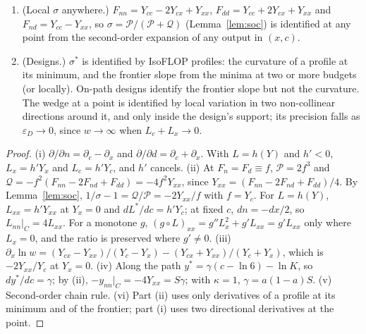 \begin{proposition}
\begin{enumerate}
imposes $S=\gamma/[a(1-a)]$: the curvature of every IsoFLOP profile in log reducible loss is pinned by the slopes of the
frontier and of the path. With $\kappa$ free the curvature is a separate parameter, which \eqref{eq:A-mf} measures.
\item[(v)] (Local $\sigma$ anywhere.) $F_{nn}=Y_{cc}-2Y_{cx}+Y_{xx}$, $F_{dd}=Y_{cc}+2Y_{cx}+Y_{xx}$ and
$F_{nd}=Y_{cc}-Y_{xx}$, so $\sigma=\mathcal P/(\mathcal P+\mathcal Q)$ (Lemma~\ref{lem:soc}) is identified at any point from the second-order
expansion of any output in $(x,c)$.
\item[(vi)] (Designs.) $\sigma^*$ is identified by IsoFLOP profiles: the curvature of a profile at its minimum, and the
frontier slope from the minima at two or more budgets (or locally). On-path designs identify the frontier slope but not
the curvature. The wedge at a point is identified by local variation in two non-collinear directions around it, and only
inside the design's support; its precision falls as $\varepsilon_D\to0$, since $w\to\infty$ when $L_c+L_x\to0$.
\end{enumerate}
\end{proposition}

\begin{proof}
(i) $\partial/\partial n=\partial_c-\partial_x$ and $\partial/\partial d=\partial_c+\partial_x$. With $L=h(Y)$ and $h'<0$,
$L_x=h'Y_x$ and $L_c=h'Y_c$, and $h'$ cancels. (ii) At $F_n=F_d\equiv f$, $\mathcal P=2f^3$ and
$\mathcal Q=-f^2(F_{nn}-2F_{nd}+F_{dd})=-4f^2Y_{xx}$, since $Y_{xx}=(F_{nn}-2F_{nd}+F_{dd})/4$. By Lemma~\ref{lem:soc},
$1/\sigma-1=\mathcal Q/\mathcal P=-2Y_{xx}/f$ with $f=Y_c$. For $L=h(Y)$,
$L_{xx}=h'Y_{xx}$ at $Y_x=0$ and $dL^*/dc=h'Y_c$; at fixed $c$, $dn=-dx/2$, so $L_{nn}|_C=4L_{xx}$. For a monotone $g$,
$(g\circ L)_{xx}=g''L_x^2+g'L_{xx}=g'L_{xx}$ only where $L_x=0$, and the ratio is preserved where $g'\neq0$. (iii) $\partial_x\ln w=(Y_{cx}-Y_{xx})/(Y_c-Y_x)-(Y_{cx}+Y_{xx})/(Y_c+Y_x)$,
which is $-2Y_{xx}/Y_c$ at $Y_x=0$. (iv) Along the path $y^*=\gamma(c-\ln6)-\ln K$, so $dy^*/dc=\gamma$; by (ii),
$-y_{nn}|_C=-4Y_{xx}=S\gamma$; with $\kappa=1$, $\gamma=a(1-a)S$. (v) Second-order chain rule. (vi) Part (ii) uses only
derivatives of a profile at its minimum and of the frontier; part (i) uses two directional derivatives at the point.
\end{proof}

